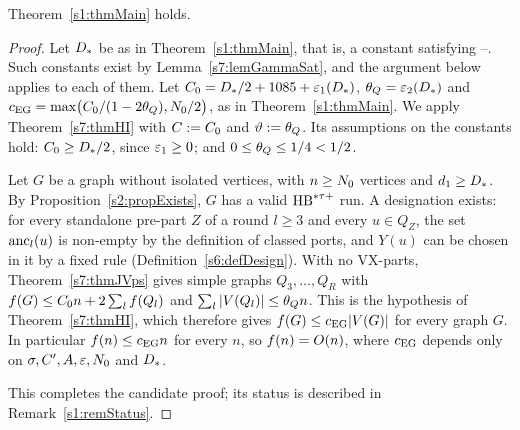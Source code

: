 \begin{corollary}\label{s7:thmMainProof}
Theorem~\ref{s1:thmMain} holds.
\deps{\ref{s7:thmHI}, \ref{s7:thmJVps}, \ref{s2:propExists}, \ref{s7:lemGammaSat}, \ref{s6:defDesign}, \ref{s1:condGamma}, \ref{s1:defConstants}}
\end{corollary}

\begin{proof}
Let $D_{*}$ be as in Theorem~\ref{s1:thmMain}, that is, a constant satisfying
--. Such constants exist by Lemma~\ref{s7:lemGammaSat}, and the
argument below applies to each of them. Let
$C_{0}=D_{*}/2+1085+\varepsilon_{1}(D_{*})$, $\theta_{Q}=\varepsilon_{2}(D_{*})$ and
$c_{\mathrm{EG}}=\max\bigl(C_{0}/(1-2\theta_{Q}),N_{0}/2\bigr)$, as in
Theorem~\ref{s1:thmMain}. We apply Theorem~\ref{s7:thmHI} with $C\mathrel{:=}C_{0}$
and $\vartheta\mathrel{:=}\theta_{Q}$. Its assumptions on the constants hold:
$C_{0}\ge D_{*}/2$, since $\varepsilon_{1}\ge0$; and $0\le\theta_{Q}\le1/4<1/2$.

Let $G$ be a graph without isolated vertices, with $n\ge N_{0}$ vertices and
$d_1\ge D_{*}$. By Proposition~\ref{s2:propExists}, $G$ has a valid $\mathrm{HB}^{*\tau{+}}$
run. A designation exists: for every standalone pre-part $Z$ of a round $l\ge3$
and every $u\in Q_Z$, the set $\mathrm{anc}_l(u)$ is non-empty by the definition of
classed ports, and $Y(u)$ can be chosen in it by a fixed rule
(Definition~\ref{s6:defDesign}). With no VX-parts, Theorem~\ref{s7:thmJVps} gives
simple graphs $Q_3,\dots,Q_R$ with $f(G)\le C_{0} n+2\sum_lf(Q_l)$ and
$\sum_l|V(Q_l)|\le\theta_{Q} n$. This is the hypothesis of
Theorem~\ref{s7:thmHI}, which therefore gives $f(G)\le c_{\mathrm{EG}}|V(G)|$ for every
graph $G$. In particular $f(n)\le c_{\mathrm{EG}} n$ for every $n$, so $f(n)=O(n)$, where
$c_{\mathrm{EG}}$ depends only on $\sigma,C',A,\varepsilon,N_{0}$ and $D_{*}$.

This completes the candidate proof; its status is described in Remark~\ref{s1:remStatus}.
\end{proof}

